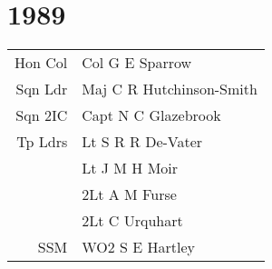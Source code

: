 \chapter*{1989}

\vspace*{10mm}

\begin{center}
  \begin{tabular}{rl}
    Hon Col & Col G E Sparrow \\
    Sqn Ldr & Maj C R Hutchinson-Smith \\
    Sqn 2IC & Capt N C Glazebrook \\
    Tp Ldrs & Lt S R R De-Vater \\
     & Lt J M H Moir \\
     & 2Lt A M Furse \\
     & 2Lt C Urquhart \\
    SSM & WO2 S E Hartley \\
  \end{tabular}
\end{center}

\vspace*{10mm}

